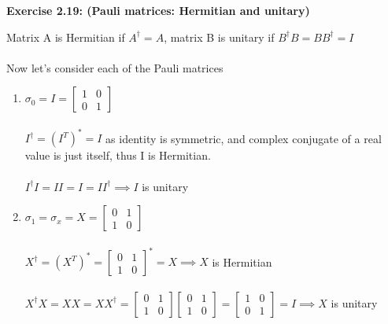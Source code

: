 \documentclass{article}
\begin{document}
\bigskip

\begin{framed}
    \noindent \textbf{Exercise 2.19: (Pauli matrices: Hermitian and unitary)}
    
    \medskip
    Matrix A is Hermitian if $A^{\dagger} = A$, matrix B is unitary if $B^{\dagger}B = BB^{\dagger} = I$ \\\\
    Now let's consider each of the Pauli matrices 
    \begin{enumerate}
        \item $\sigma_0 = I = \begin{bmatrix} 1 & 0 \\ 0 & 1 \end{bmatrix}$\\\\
        $I^{\dagger} = (I^{T})^{*} = I $ as identity is symmetric, and complex conjugate of a real value is just itself, thus I is Hermitian. \\\\
        $I^{\dagger}I = II = I = II^{\dagger} \implies I$ is unitary

        \item $\sigma_1=\sigma_x=X = \begin{bmatrix} 0 & 1 \\ 1 & 0 \end{bmatrix}$\\\\
        $X^{\dagger} = (X^{T})^* = \begin{bmatrix} 0 & 1 \\ 1 & 0 \end{bmatrix}^{*} = X \implies X$ is Hermitian\\\\
        $X^{\dagger}X = XX = XX^{\dagger} = \begin{bmatrix} 0 & 1 \\ 1 & 0 \end{bmatrix} \begin{bmatrix} 0 & 1 \\ 1 & 0 \end{bmatrix} = \begin{bmatrix} 1 & 0 \\ 0 & 1 \end{bmatrix} = I \implies X$ is unitary

        


\end{enumerate}
\end{framed}
\end{document}
